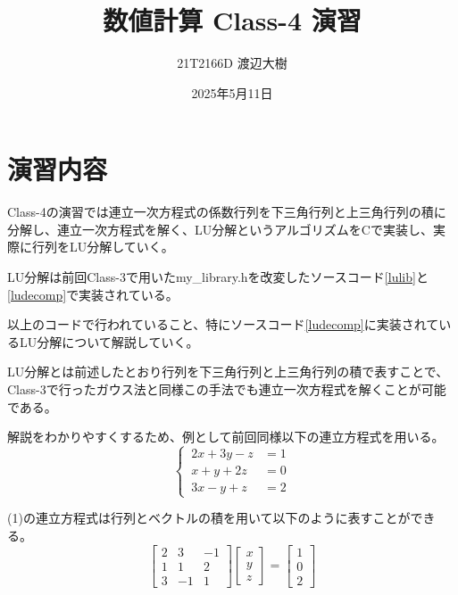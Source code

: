 \documentclass[a4paper,11pt]{jsarticle}
\begin{document}
\title{数値計算 Class-4 演習}
\author{21T2166D 渡辺大樹}
\date{2025年5月11日}
\maketitle

\section{演習内容}
Class-4の演習では連立一次方程式の係数行列を下三角行列と上三角行列の積に分解し、連立一次方程式を解く、LU分解というアルゴリズムをCで実装し、実際に行列をLU分解していく。

LU分解は前回Class-3で用いたmy\_library.hを改変したソースコード\ref{lulib}と\ref{ludecomp}で実装されている。

\newpage


以上のコードで行われていること、特にソースコード\ref{ludecomp}に実装されているLU分解について解説していく。

LU分解とは前述したとおり行列を下三角行列と上三角行列の積で表すことで、Class-3で行ったガウス法と同様この手法でも連立一次方程式を解くことが可能である。

解説をわかりやすくするため、例として前回同様以下の連立方程式を用いる。
\begin{equation}
    \left \{ \,
    \begin{aligned}
        2x + 3y - z &= 1 \\
        x + y + 2z &= 0 \\
        3x - y + z &= 2
    \end{aligned}
    \right .
\end{equation}

(1)の連立方程式は行列とベクトルの積を用いて以下のように表すことができる。
\\
\begin{equation}
    \begin{bmatrix}
        2 & 3 & -1 \\
        1 & 1 & 2 \\
        3 & -1 & 1
    \end{bmatrix}
    \begin{bmatrix}
        x \\ y \\ z
    \end{bmatrix}
    =
    \begin{bmatrix}
        1 \\ 0 \\ 2
    \end{bmatrix}
\end{equation}
\\
\end{document}
